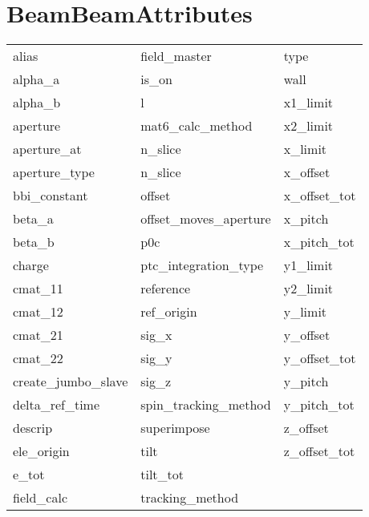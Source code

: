  \section{BeamBeamAttributes}
 \label{s:list.beambeam}
 
 \begin{tabular}{lll} \toprule
alias                       & field_master                & type                        \\
alpha_a                     & is_on                       & wall                        \\
alpha_b                     & l                           & x1_limit                    \\
aperture                    & mat6_calc_method            & x2_limit                    \\
aperture_at                 & n_slice                     & x_limit                     \\
aperture_type               & n_slice                     & x_offset                    \\
bbi_constant                & offset                      & x_offset_tot                \\
beta_a                      & offset_moves_aperture       & x_pitch                     \\
beta_b                      & p0c                         & x_pitch_tot                 \\
charge                      & ptc_integration_type        & y1_limit                    \\
cmat_11                     & reference                   & y2_limit                    \\
cmat_12                     & ref_origin                  & y_limit                     \\
cmat_21                     & sig_x                       & y_offset                    \\
cmat_22                     & sig_y                       & y_offset_tot                \\
create_jumbo_slave          & sig_z                       & y_pitch                     \\
delta_ref_time              & spin_tracking_method        & y_pitch_tot                 \\
descrip                     & superimpose                 & z_offset                    \\
ele_origin                  & tilt                        & z_offset_tot                \\
e_tot                       & tilt_tot                    &                             \\
field_calc                  & tracking_method             &                             \\
 \bottomrule
 \end{tabular}
 \vfill
 
